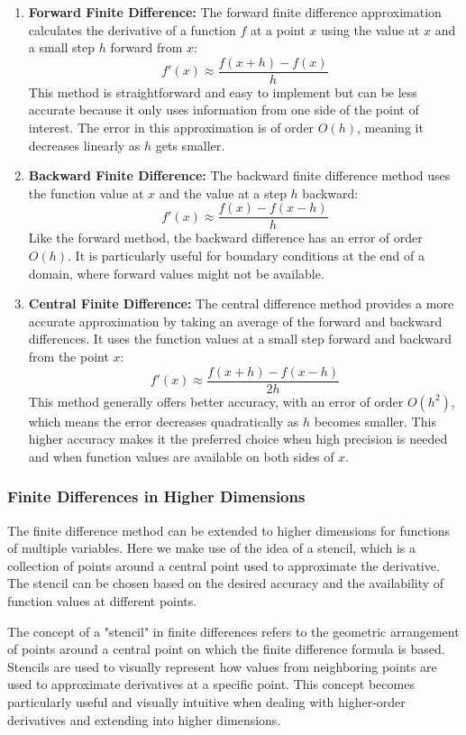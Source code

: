 \documentclass[11pt,a4paper]{article}
\theoremstyle{plain}
\theoremstyle{definition}
\theoremstyle{remark}
\begin{document}
\begin{enumerate}
    \item \textbf{Forward Finite Difference:} The forward finite difference approximation calculates the derivative of a function \( f \) at a point \( x \) using the value at \( x \) and a small step \( h \) forward from \( x \):
    \[ f'(x) \approx \frac{f(x+h) - f(x)}{h} \]
    This method is straightforward and easy to implement but can be less accurate because it only uses information from one side of the point of interest. The error in this approximation is of order \( O(h) \), meaning it decreases linearly as \( h \) gets smaller.

    \item \textbf{Backward Finite Difference:} The backward finite difference method uses the function value at \( x \) and the value at a step \( h \) backward:
    \[ f'(x) \approx \frac{f(x) - f(x-h)}{h} \]
    Like the forward method, the backward difference has an error of order \( O(h) \). It is particularly useful for boundary conditions at the end of a domain, where forward values might not be available.

    \item \textbf{Central Finite Difference:} The central difference method provides a more accurate approximation by taking an average of the forward and backward differences. It uses the function values at a small step forward and backward from the point \( x \):
    \[ f'(x) \approx \frac{f(x+h) - f(x-h)}{2h} \]
    This method generally offers better accuracy, with an error of order \( O(h^2) \), which means the error decreases quadratically as \( h \) becomes smaller. This higher accuracy makes it the preferred choice when high precision is needed and when function values are available on both sides of \( x \).
\end{enumerate}

\subsubsection{Finite Differences in Higher Dimensions}

The finite difference method can be extended to higher dimensions for functions of multiple variables. Here we make use of the idea of a stencil, which is a collection of points around a central point used to approximate the derivative. The stencil can be chosen based on the desired accuracy and the availability of function values at different points.

The concept of a "stencil" in finite differences refers to the geometric arrangement of points around a central point on which the finite difference formula is based. Stencils are used to visually represent how values from neighboring points are used to approximate derivatives at a specific point. This concept becomes particularly useful and visually intuitive when dealing with higher-order derivatives and extending into higher dimensions.
\end{document}
